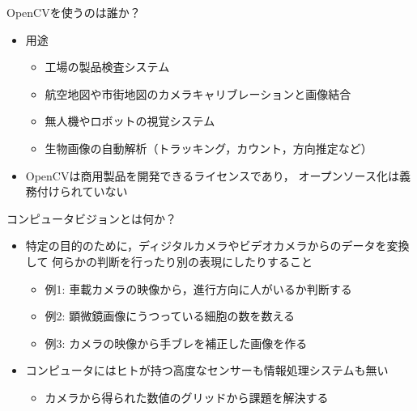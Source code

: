\documentclass[10pt]{beamer}
\newcommand{\mymain}[1]{\textcolor{mLightBrown}{#1}}
\begin{document}
	\begin{frame}{OpenCVを使うのは誰か？}
	    \begin{itemize}
            \item 用途
                \begin{itemize}
                    \item 工場の製品検査システム
                    \item 航空地図や市街地図のカメラキャリブレーションと画像結合
                    \item 無人機やロボットの視覚システム
                    \item 生物画像の自動解析（トラッキング，カウント，方向推定など）
                \end{itemize}
            \item OpenCVは商用製品を開発できるライセンスであり，
                オープンソース化は義務付けられていない
        \end{itemize}
	\end{frame}
	
	\begin{frame}{コンピュータビジョンとは何か？}
	    \begin{itemize}
	        \item 特定の目的のために，ディジタルカメラやビデオカメラからのデータを変換して
	            何らかの判断を行ったり別の表現にしたりすること
	            \begin{itemize}
	                \item 例1: 車載カメラの映像から，進行方向に人がいるか判断する
	                \item 例2: 顕微鏡画像にうつっている細胞の数を数える
	                \item 例3: カメラの映像から手ブレを補正した画像を作る
	            \end{itemize}
	        \item コンピュータにはヒトが持つ高度なセンサーも情報処理システムも無い
	            \begin{itemize}
	                \item カメラから得られた\mymain{数値のグリッド}から課題を解決する
	            \end{itemize}
	    \end{itemize}
	\end{frame}
	
\end{document}
